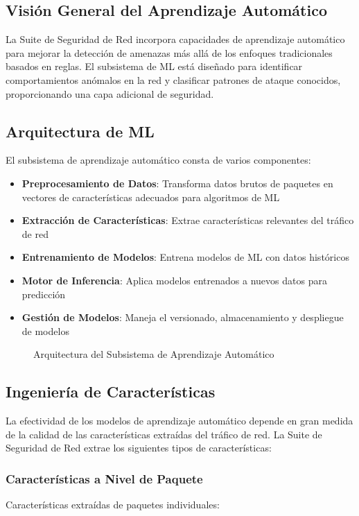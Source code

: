 \subsection{Visión General del Aprendizaje Automático}
La Suite de Seguridad de Red incorpora capacidades de aprendizaje automático para mejorar la detección de amenazas más allá de los enfoques tradicionales basados en reglas. El subsistema de ML está diseñado para identificar comportamientos anómalos en la red y clasificar patrones de ataque conocidos, proporcionando una capa adicional de seguridad.

\subsection{Arquitectura de ML}
El subsistema de aprendizaje automático consta de varios componentes:

\begin{itemize}
    \item \textbf{Preprocesamiento de Datos}: Transforma datos brutos de paquetes en vectores de características adecuados para algoritmos de ML
    \item \textbf{Extracción de Características}: Extrae características relevantes del tráfico de red
    \item \textbf{Entrenamiento de Modelos}: Entrena modelos de ML con datos históricos
    \item \textbf{Motor de Inferencia}: Aplica modelos entrenados a nuevos datos para predicción
    \item \textbf{Gestión de Modelos}: Maneja el versionado, almacenamiento y despliegue de modelos
\end{itemize}

\begin{figure}[H]
    \centering

    \caption{Arquitectura del Subsistema de Aprendizaje Automático}
    \label{fig:ml_architecture}
\end{figure}

\subsection{Ingeniería de Características}
La efectividad de los modelos de aprendizaje automático depende en gran medida de la calidad de las características extraídas del tráfico de red. La Suite de Seguridad de Red extrae los siguientes tipos de características:

\subsubsection{Características a Nivel de Paquete}
Características extraídas de paquetes individuales:

